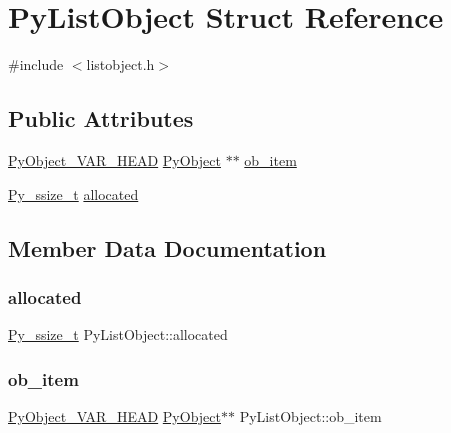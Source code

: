 \hypertarget{struct_py_list_object}{}\section{Py\+List\+Object Struct Reference}
\label{struct_py_list_object}


{\ttfamily \#include $<$listobject.\+h$>$}

\subsection*{Public Attributes}
\begin{DoxyCompactItemize}
\item 
\mbox{\hyperlink{_python27_2object_8h_aa0eba161a76be8710b3de325c2e7f9e2}{Py\+Object\+\_\+\+V\+A\+R\+\_\+\+H\+E\+AD}} \mbox{\hyperlink{_python27_2object_8h_aadc84ac7aed2cfa6f20c25f62bf3dac7}{Py\+Object}} $\ast$$\ast$ \mbox{\hyperlink{struct_py_list_object_acf0d6da7facc80844c97ce9924b0a552}{ob\+\_\+item}}
\item 
\mbox{\hyperlink{pyport_8h_ac6411a3dfda9ac6feb9e8d859b1184bc}{Py\+\_\+ssize\+\_\+t}} \mbox{\hyperlink{struct_py_list_object_aee6a653357317c00222fe91f315bc9b7}{allocated}}
\end{DoxyCompactItemize}


\subsection{Member Data Documentation}
\mbox{\label{struct_py_list_object_aee6a653357317c00222fe91f315bc9b7}} 
\subsubsection{\texorpdfstring{allocated}{allocated}}
{\footnotesize\ttfamily \mbox{\hyperlink{pyport_8h_ac6411a3dfda9ac6feb9e8d859b1184bc}{Py\+\_\+ssize\+\_\+t}} Py\+List\+Object\+::allocated}

\mbox{\label{struct_py_list_object_acf0d6da7facc80844c97ce9924b0a552}} 
\subsubsection{\texorpdfstring{ob\_item}{ob\_item}}
{\footnotesize\ttfamily \mbox{\hyperlink{_python27_2object_8h_aa0eba161a76be8710b3de325c2e7f9e2}{Py\+Object\+\_\+\+V\+A\+R\+\_\+\+H\+E\+AD}} \mbox{\hyperlink{_python27_2object_8h_aadc84ac7aed2cfa6f20c25f62bf3dac7}{Py\+Object}}$\ast$$\ast$ Py\+List\+Object\+::ob\+\_\+item}



